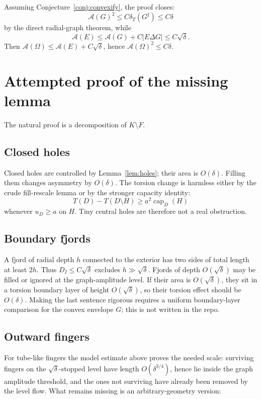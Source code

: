 \documentclass[11pt]{article}
\newcommand{\Om}{\Omega}
\newcommand{\dT}{\delta_T}
\newcommand{\A}{\mathcal A}
\begin{document}
Assuming Conjecture~\ref{conj:convexify}, the proof closes:
\[
   \A(G)^2\le C\dT(G^\sharp)\le C\delta
\]
by the direct radial-graph theorem, while
\[
   \A(E)\le \A(G)+C|E\Delta G|\le C\sqrt\delta.
\]
Then \(\A(\Om)\le \A(E)+C\sqrt\delta\), hence \(\A(\Om)^2\le C\delta\).

\section{Attempted proof of the missing lemma}

The natural proof is a decomposition of \(K\setminus F\).

\subsection{Closed holes}

Closed holes are controlled by Lemma~\ref{lem:holes}; their area is
\(O(\delta)\).  Filling them changes asymmetry by \(O(\delta)\).  The torsion
change is harmless either by the crude fill-rescale lemma or by the stronger
capacity identity:
\[
   T(D)-T(D\setminus H)\ge a^2\operatorname{cap}_D(H)
\]
whenever \(u_D\ge a\) on \(H\).  Tiny central holes are therefore not a real
obstruction.

\subsection{Boundary fjords}

A fjord of radial depth \(h\) connected to the exterior has two sides of total
length at least \(2h\).  Thus \(D_I\le C\sqrt\delta\) excludes \(h\gg
\sqrt\delta\).  Fjords of depth \(O(\sqrt\delta)\) may be filled or ignored at
the graph-amplitude level.  If their area is \(O(\sqrt\delta)\), they sit in a
torsion boundary layer of height \(O(\sqrt\delta)\), so their torsion effect
should be \(O(\delta)\).  Making the last sentence rigorous requires a
uniform boundary-layer comparison for the convex envelope \(G\); this is not
written in the repo.

\subsection{Outward fingers}

For tube-like fingers the model estimate above proves the needed scale:
surviving fingers on the \(\sqrt\delta\)-stopped level have length
\(O(\delta^{3/4})\), hence lie inside the graph amplitude threshold, and the
ones not surviving have already been removed by the level flow.  What remains
missing is an arbitrary-geometry version:
\end{document}
